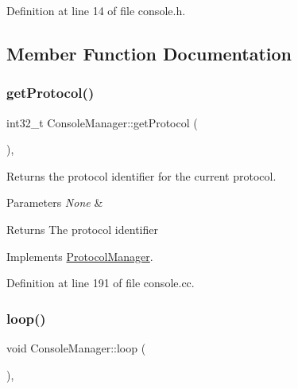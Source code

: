 Definition at line 14 of file console.\+h.



\subsection{Member Function Documentation}
\mbox{\label{classConsoleManager_a12c11521d46af302d6c7d79d3b8174b4}} 
\subsubsection{\texorpdfstring{get\+Protocol()}{getProtocol()}}
{\footnotesize\ttfamily int32\+\_\+t Console\+Manager\+::get\+Protocol (\begin{DoxyParamCaption}{ }\end{DoxyParamCaption})\hspace{0.3cm}{\ttfamily [override]}, {\ttfamily [virtual]}}



Returns the protocol identifier for the current protocol. 


\begin{DoxyParams}{Parameters}
{\em None} & \\
\hline
\end{DoxyParams}
\begin{DoxyReturn}{Returns}
The protocol identifier 
\end{DoxyReturn}


Implements \mbox{\hyperlink{classProtocolManager_a2ab274fd7510b28e7ac36405aebdbe82}{Protocol\+Manager}}.



Definition at line 191 of file console.\+cc.

\mbox{\label{classConsoleManager_a69261543a87cf7d3c7ec004c566145fd}} 
\subsubsection{\texorpdfstring{loop()}{loop()}}
{\footnotesize\ttfamily void Console\+Manager\+::loop (\begin{DoxyParamCaption}{ }\end{DoxyParamCaption})\hspace{0.3cm}{\ttfamily [override]}, {\ttfamily [virtual]}}



